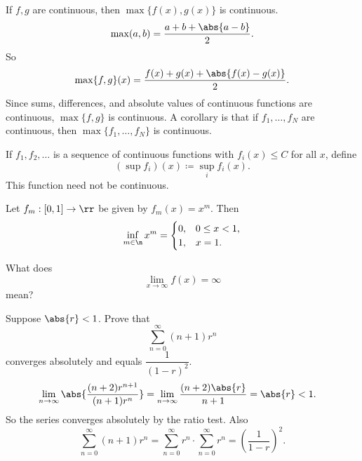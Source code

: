 

\begin{theorem}{
    If $f,g$ are continuous, then $\max\{f(x),g(x)\}$ is continuous.
}
	\[
        \max(a,b) = \dfrac{a + b + \abs{a - b}}{2}.
    \]
    So
    \[
        \max\{f,g\}(x) = \dfrac{f(x) + g(x) + \abs{f(x) - g(x)}}{2}.
    \]
    Since sums, differences, and absolute values of continuous functions are continuous, $\max\{f,g\}$ is continuous.
    A corollary is that if $f_1,\ldots,f_N$ are continuous, then $\max\{f_1,\ldots,f_N\}$ is continuous.
\end{theorem}

\begin{example}
    If $f_1,f_2,\ldots$ is a sequence of continuous functions with $f_i(x)\leq C$ for all $x$, define
    \[
        (\sup f_i)(x) \coloneqq \sup_{i} f_i(x).
    \]
    This function need not be continuous.
\end{example}

\begin{example}
    Let $f_m : [0,1]\to\rr$ be given by $f_m(x) = x^m$.
    Then
    \[
        \inf_{m\in\n} x^m =
        \begin{cases}
            0, & 0\leq x < 1,\\
            1, & x = 1.
        \end{cases}
    \]
\end{example}

\begin{example}
    What does
    \[
        \lim_{x\to\infty} f(x) = \infty
    \]
    mean?
\end{example}

\begin{problem}{
    Suppose $\abs{r}<1$.
    Prove that
    \[
        \sum_{n=0}^{\infty}(n+1)r^n
    \]
    converges absolutely and equals $\dfrac{1}{(1-r)^2}$.
}
    \begin{align*}
        \lim_{n\to\infty}
        \abs{\dfrac{(n+2)r^{n+1}}{(n+1)r^n}}
        &=
        \lim_{n\to\infty}
        \dfrac{(n+2)\abs{r}}{n+1}
        = \abs{r} < 1.
    \end{align*}
    So the series converges absolutely by the ratio test.
    Also
    \[
        \sum_{n=0}^{\infty}(n+1)r^n
        =
        \sum_{n=0}^{\infty}r^n \cdot \sum_{n=0}^{\infty}r^n
        =
        \left(\dfrac{1}{1-r}\right)^2.
    \]
\end{problem}

